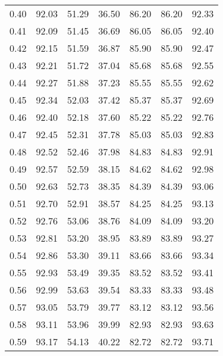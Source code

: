 \begin{tabular}{|c|c|c|c|c|c|c|}
      0.40 &     92.03 &     51.29 &      36.50 &   86.20 &      86.20 &         92.33 \\
      0.41 &     92.09 &     51.45 &      36.69 &   86.05 &      86.05 &         92.40 \\
      0.42 &     92.15 &     51.59 &      36.87 &   85.90 &      85.90 &         92.47 \\
      0.43 &     92.21 &     51.72 &      37.04 &   85.68 &      85.68 &         92.55 \\
      0.44 &     92.27 &     51.88 &      37.23 &   85.55 &      85.55 &         92.62 \\
      0.45 &     92.34 &     52.03 &      37.42 &   85.37 &      85.37 &         92.69 \\
      0.46 &     92.40 &     52.18 &      37.60 &   85.22 &      85.22 &         92.76 \\
      0.47 &     92.45 &     52.31 &      37.78 &   85.03 &      85.03 &         92.83 \\
      0.48 &     92.52 &     52.46 &      37.98 &   84.83 &      84.83 &         92.91 \\
      0.49 &     92.57 &     52.59 &      38.15 &   84.62 &      84.62 &         92.98 \\
      0.50 &     92.63 &     52.73 &      38.35 &   84.39 &      84.39 &         93.06 \\
      0.51 &     92.70 &     52.91 &      38.57 &   84.25 &      84.25 &         93.13 \\
      0.52 &     92.76 &     53.06 &      38.76 &   84.09 &      84.09 &         93.20 \\
      0.53 &     92.81 &     53.20 &      38.95 &   83.89 &      83.89 &         93.27 \\
      0.54 &     92.86 &     53.30 &      39.11 &   83.66 &      83.66 &         93.34 \\
      0.55 &     92.93 &     53.49 &      39.35 &   83.52 &      83.52 &         93.41 \\
      0.56 &     92.99 &     53.63 &      39.54 &   83.33 &      83.33 &         93.48 \\
      0.57 &     93.05 &     53.79 &      39.77 &   83.12 &      83.12 &         93.56 \\
      0.58 &     93.11 &     53.96 &      39.99 &   82.93 &      82.93 &         93.63 \\
      0.59 &     93.17 &     54.13 &      40.22 &   82.72 &      82.72 &         93.71 \\

\end{tabular}

